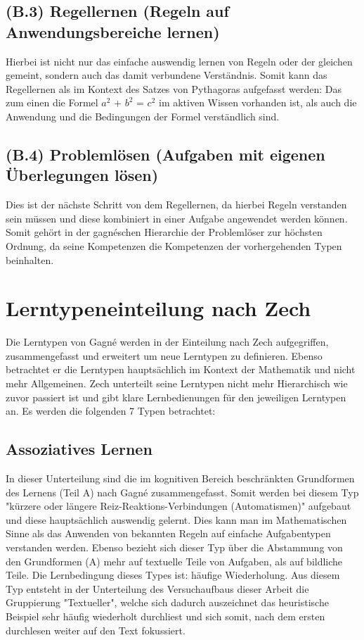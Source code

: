 \subsection[]{(B.3) Regellernen (Regeln auf Anwendungsbereiche lernen)}

Hierbei ist nicht nur das einfache auswendig lernen von Regeln oder der gleichen gemeint, sondern auch das damit verbundene Verständnis. Somit kann das Regellernen als im Kontext des Satzes von Pythagoras aufgefasst werden: Das zum einen die Formel $a^2$ + $b^2$ = $c^2$ im aktiven Wissen vorhanden ist, als auch die Anwendung und die Bedingungen der Formel verständlich sind.

\subsection[]{(B.4) Problemlösen (Aufgaben mit eigenen Überlegungen lösen)}

Dies ist der nächste Schritt von dem Regellernen, da hierbei Regeln verstanden sein müssen und diese kombiniert in einer Aufgabe angewendet werden können. Somit gehört in der gagnéschen Hierarchie der Problemlöser zur höchsten Ordnung, da seine Kompetenzen die Kompetenzen der vorhergehenden Typen beinhalten.

\section{Lerntypeneinteilung nach Zech}

Die Lerntypen von Gagné werden in der Einteilung nach Zech aufgegriffen, zusammengefasst und erweitert um neue Lerntypen zu definieren. Ebenso betrachtet er die Lerntypen hauptsächlich im Kontext der Mathematik und nicht mehr Allgemeinen. Zech unterteilt seine Lerntypen nicht mehr Hierarchisch wie zuvor passiert ist und gibt klare Lernbedienungen für den jeweiligen Lerntypen an. Es werden die folgenden 7 Typen betrachtet:

\subsection[]{Assoziatives Lernen}

In dieser Unterteilung sind die im kognitiven Bereich beschränkten Grundformen des Lernens (Teil A) nach Gagné zusammengefasst. Somit werden bei diesem Typ "kürzere oder längere Reiz-Reaktions-Verbindungen (Automatismen)" aufgebaut und diese hauptsächlich auswendig gelernt. Dies kann man im Mathematischen Sinne als das Anwenden von bekannten Regeln auf einfache Aufgabentypen verstanden werden. Ebenso bezieht sich dieser Typ über die Abstammung von den Grundformen (A) mehr auf textuelle Teile von Aufgaben, als auf bildliche Teile.
Die Lernbedingung dieses Types ist: häufige Wiederholung. 
Aus diesem Typ entsteht in der Unterteilung des Versuchaufbaus dieser Arbeit die Gruppierung "Textueller", welche sich dadurch auszeichnet das heuristische Beispiel sehr häufig wiederholt durchliest und sich somit, nach dem ersten durchlesen weiter auf den Text fokussiert. 


